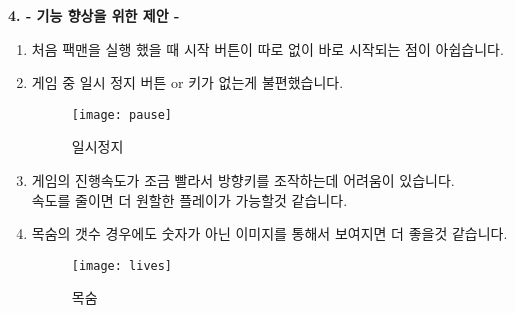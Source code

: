 \documentclass{article}
\begin{document}
\newpage
\begin{large}\textbf{4. - 기능 향상을 위한 제안 -}\end{large}
\begin{enumerate}
\item 처음 팩맨을 실행 했을 때 시작 버튼이 따로 없이 바로 시작되는 점이 아쉽습니다.
\item 게임 중 일시 정지 버튼 or 키가 없는게 불편했습니다.

 \begin{figure}[!h]
\centering
\texttt{[image: pause]}
\caption{일시정지}%
\end{figure}

\item 게임의 진행속도가 조금 빨라서 방향키를 조작하는데 어려움이 있습니다.\\ 속도를 줄이면 더 원할한 플레이가 가능할것 같습니다.
\item 목숨의 갯수 경우에도 숫자가 아닌 이미지를 통해서 보여지면 더 좋을것 같습니다.
 \begin{figure}[!h]
\centering
\texttt{[image: lives]}
\caption{목숨}%
\end{figure}
\end{enumerate}
\end{document}
